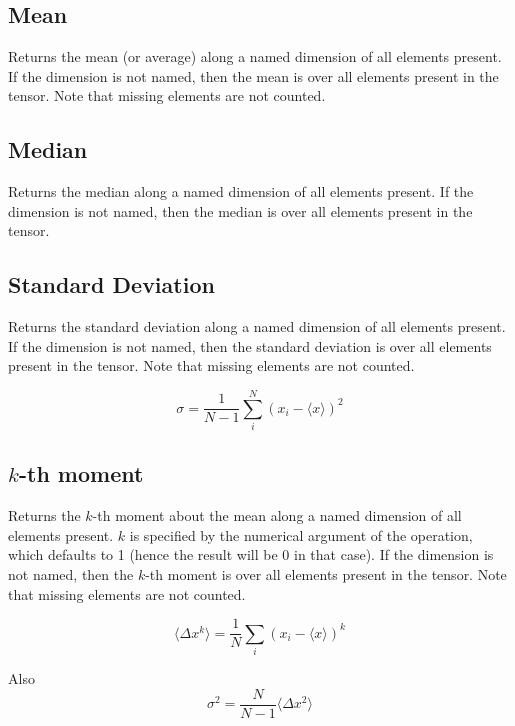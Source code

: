 \subsection{Mean}\label{Operation:mean}

Returns the mean (or average) along a named dimension of all
elements present. If the dimension is not named, then the mean is
over all elements present in the tensor. Note that missing elements
are not counted.

\subsection{Median}\label{Operation:median}

Returns the median  along a named dimension of all
elements present. If the dimension is not named, then the median is
over all elements present in the tensor. 

\subsection{Standard Deviation}\label{Operation:stdDev}

Returns the standard deviation along a named dimension of all
elements present. If the dimension is not named, then the standard
deviation is over all elements present in the tensor. Note that
missing elements are not counted.

\begin{displaymath}
  \sigma = \frac1{N-1}\sum_i^N (x_i-\langle x\rangle)^2
\end{displaymath}

\subsection{$k$-th moment}\label{Operation:moment}
  
Returns the $k$-th moment about the mean along a named dimension of
all elements present. $k$ is specified by the numerical argument of
the operation, which defaults to 1 (hence the result will be 0 in that
case). If the dimension is not named, then the $k$-th moment is over
all elements present in the tensor. Note that missing elements are not
counted.

\begin{displaymath}
  \langle\Delta x^k\rangle = \frac1N\sum_i(x_i-\langle x\rangle)^k
\end{displaymath}

Also
\begin{displaymath}
  \sigma^2 = \frac{N}{N-1}\langle\Delta x^2\rangle
\end{displaymath}


